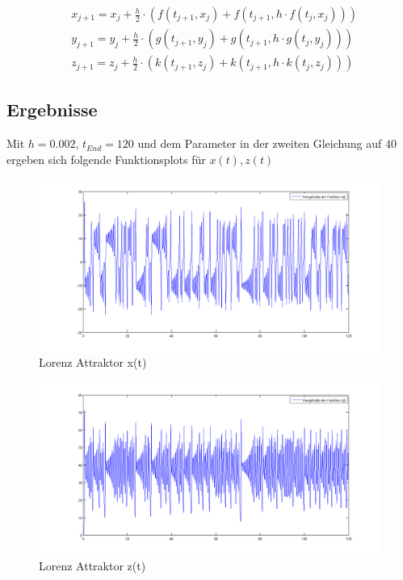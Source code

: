 \documentclass[10pt]{scrartcl}
\begin{document}
		\begin{align}
				&x_{j+1}=x_{j} + \frac{h}{2} \cdot (f(t_{j+1}, x_{j}) + f(t_{j+1}, h \cdot f(t_j, x_j)) )\\
				&y_{j+1}=y_{j} + \frac{h}{2} \cdot (g(t_{j+1}, y_{j}) + g(t_{j+1}, h \cdot g(t_j, y_j)) )\\
				&z_{j+1}=z_{j} + \frac{h}{2} \cdot (k(t_{j+1}, z_{j}) + k(t_{j+1}, h \cdot k(t_j, z_j)) )
		\end{align}
		
		\subsection{Ergebnisse}		
		Mit $h=0.002$, $t_{End} = 120$ und dem Parameter in der zweiten Gleichung auf $40$ ergeben sich folgende Funktionsplots für $x(t), z(t)$
		\begin{figure}[H]
			\centering	
			\includegraphics[width=\textwidth]{lorenzxt.png}
            \caption{Lorenz Attraktor x(t)}
            \label{pic:xt}
		\end{figure} 
		
		\begin{figure}[H]
			\centering	
			\includegraphics[width=\textwidth]{lorenzzt.png}
            \caption{Lorenz Attraktor z(t)}
            \label{pic:zt}
		\end{figure} 
		
\end{document}

